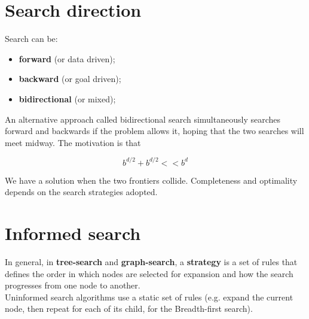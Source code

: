 \documentclass{article}
\begin{document}
\newpage

\section{Search direction}

Search can be:

\begin{itemize}
    \item \textbf{forward} (or data driven);
    \item \textbf{backward} (or goal driven);
    \item \textbf{bidirectional} (or mixed);
\end{itemize}

An alternative approach called bidirectional search simultaneously searches forward and backwards if the problem allows it, hoping that the two searches will meet midway. The motivation is that

\begin{equation}
    b^{d/2} + b^{d/2} << b^d
\end{equation}

\begin{flushleft}
    We have a solution when the two frontiers collide. Completeness and optimality depends on the search strategies adopted.
\end{flushleft}

\newpage

\section{Informed search}

In general, in \textbf{tree-search} and \textbf{graph-search}, a \textbf{strategy} is a set of rules that defines the order in which nodes are selected for expansion and how the search progresses from one node to another. \\
Uninformed search algorithms use a static set of rules (e.g. expand the current node, then repeat for each of its child, for the Breadth-first search). \\
\end{document}

